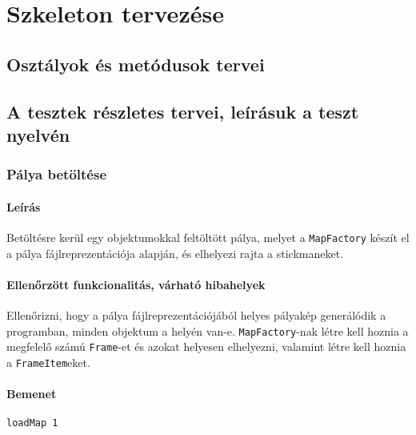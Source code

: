 

\usepackage{enumitem}



\fedlap

\addtocounter{section}{7}
\section{Szkeleton tervezése}
	\subsection{Osztályok és metódusok tervei}
	
	\subsection{A tesztek részletes tervei, leírásuk a teszt nyelvén}
			\newcommand{\testitem}[1]{\subsubsection{#1}}
			\newcommand{\tdesc}[1]{\paragraph*{Leírás} #1}
			\newcommand{\tcel}[1]{\paragraph*{Ellenőrzött funkcionalitás, várható hibahelyek} #1}
		        
		        \testitem{Pálya betöltése}
		        \tdesc{Betöltésre kerül egy objektumokkal feltöltött pálya, melyet a \texttt{MapFactory} készít el a pálya fájlreprezentációja alapján, és elhelyezi rajta a stickmaneket.}
		        \tcel{Ellenőrizni, hogy a pálya fájlreprezentációjából helyes pályakép generálódik a programban, minden objektum a helyén van-e. \texttt{MapFactory}-nak létre kell hoznia a megfelelő számú \texttt{Frame}-et és azokat helyesen elhelyezni, valamint létre kell hoznia a \texttt{FrameItem}eket.}
		        \paragraph*{Bemenet}
\begin{verbatim}
loadMap 1	
\end{verbatim}
